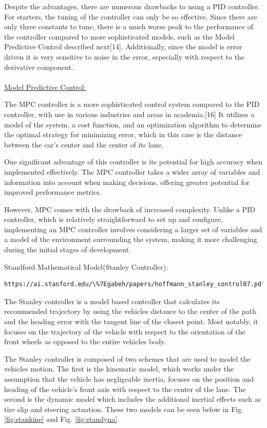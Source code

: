 \documentclass[titlepage]{article}
\begin{document}
Despite the advantages, there are numerous drawbacks to using a PID controller. For starters, the tuning of the controller can only be so effective. Since there are only three constants to tune, there is a much worse peak to the performance of the controller compared to more sophisticated models, such as the Model Predictive Control described next[14]. Additionally, since the model is error driven it is very sensitive to noise in the error, especially with respect to the derivative component.\\~\\
\underline{Model Predictive Control:}

The MPC controller is a more sophisticated control system compared to the PID controller, with use in various industries and areas in academia.[16] It utilizes a model of the system, a cost function, and an optimization algorithm to determine the optimal strategy for minimizing error, which in this case is the distance between the car’s center and the center of its lane. 

One significant advantage of this controller is its potential for high accuracy when implemented effectively. The MPC controller takes a wider array of variables and information into account when making decisions, offering greater potential for improved performance metrics. 

However, MPC comes with the drawback of increased complexity. Unlike a PID controller, which is relatively straightforward to set up and configure, implementing an MPC controller involves considering a larger set of variables and a model of the environment surrounding the system, making it more challenging during the initial stages of development. 

Standford Mathematical Model(Stanley Controller):

\begin{verbatim}
https://ai.stanford.edu/\%7Egabeh/papers/hoffmann_stanley_control07.pdf
\end{verbatim}

The Stanley controller is a model based controller that calculates its recommended trajectory by using the vehicles distance to the center of the path and the heading error with the tangent line of the closest point. Most notably, it focuses on the trajectory of the vehicle with respect to the orientation of the front wheels as opposed to the entire vehicles body. 

The Stanley controller is composed of two schemes that are used to model the vehicles motion. The first is the kinematic model, which works under the assumption that the vehicle has negligeable inertia, focuses on the position and heading of the vehicle's front axis with respect to the center of the lane. The second is the dynamic model which includes the additional inertial effects such as tire slip and steering actuation. These two models can be seen below in Fig. \ref{fig:stankine} and Fig. \ref{fig:standyna}.
\end{document}
